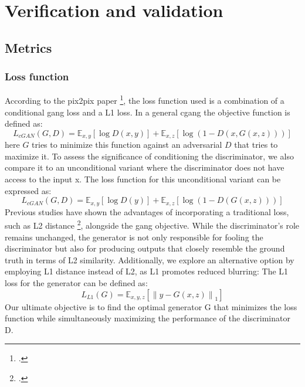 \chapter{Verification and validation}\label{cap:verification-validation}
\section{Metrics}\label{sec:metrics}
\subsection{Loss function}
According to the pix2pix paper \footcite{paper:pix2pix}, the loss function used is a combination of a conditional \gls{gang} loss and a L1 loss.
In a general \gls{cgang} the objective function is defined as:
\begin{equation}
    \label{eq:cgan-loss}
    L_{cGAN}(G, D) = \mathbb{E}_{x,y}[\log D(x, y)] + \mathbb{E}_{x,z}[\log(1 - D(x, G(x, z)))]
\end{equation}
here $G$ tries to minimize this function against an adversarial $D$ that tries to maximize it.
To assess the significance of conditioning the discriminator, we also compare it to an unconditional variant where the discriminator does not have access to the input x. 
The loss function for this unconditional variant can be expressed as:
\begin{equation}
    \label{eq:cgan-loss-uncond}
    L_{cGAN}(G, D) = \mathbb{E}_{x,y}[\log D(y)] + \mathbb{E}_{x,z}[\log(1 - D(G(x, z)))]
\end{equation}
Previous studies have shown the advantages of incorporating a traditional loss, such as L2 distance \footcite{paper:DPathakCVPR16}, alongside the \gls{gang} objective. 
While the discriminator's role remains unchanged, the generator is not only responsible for fooling the discriminator but also for producing outputs that closely resemble the ground truth in terms of L2 similarity. 
Additionally, we explore an alternative option by employing L1 distance instead of L2, as L1 promotes reduced blurring:
The L1 loss for the generator can be defined as:
\begin{equation}
    \label{eq:l1-loss}
    L_{L1}(G) = \mathbb{E}_{x,y,z}\left[\left\|y - G(x, z)\right\|_1\right]
\end{equation}
Our ultimate objective is to find the optimal generator G that minimizes the loss function while simultaneously maximizing the performance of the discriminator D. 
